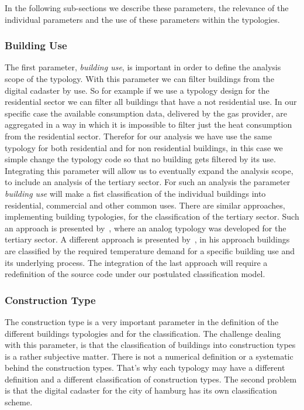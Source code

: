 \documentclass[authoryear,preprint,review,12pt]{elsarticle}
\begin{document}
\begin{linenumbers}
In the following sub-sections we describe these parameters, the relevance of the
individual parameters and the use of these parameters within the typologies.\\

\subsubsection{Building Use}

The first parameter, \textit{building use}, is important in order to define the
analysis scope of the typology.  With this parameter we can filter buildings
from the digital cadaster by use. So for example if we use a typology design
for the residential sector we can filter all buildings that have a not
residential use. In our specific case the available consumption data, delivered
by the gas provider, are aggregated in a way in which it is impossible to
filter just the heat consumption from the residential sector.  Therefor for our
analysis we have use the same typology for both residential and for non
residential buildings, in this case we simple change the typology code so that
no building gets filtered by its use.\\

Integrating this parameter will allow us to eventually expand the analysis
scope, to include an analysis of the tertiary sector.  For such an analysis the
parameter \textit{building use} will make a fist classification of the
individual buildings into residential, commercial and other common uses. There
are similar approaches, implementing building typologies, for the
classification of the tertiary sector.  Such an approach is presented
by~\citet{Loga.2011}, where an analog typology was
developed for the tertiary sector.  A different approach is presented
by~\citet{Blesl.2007}, in his
approach buildings are classified by the required temperature demand for a
specific building use and its underlying process. The integration of the last
approach will require a redefinition of the source code under our postulated
classification model.\\

\subsubsection{Construction Type}\label{sub-sub-sec:Ctype}

The construction type is a very important parameter in the definition of the
different buildings typologies and for the classification.  The challenge
dealing with this parameter, is that the classification of buildings into
construction types is a rather subjective matter.  There is not a numerical
definition or a systematic behind the construction types.  That's why each
typology may have a different definition and a different classification of
construction types.  The second problem is that the digital cadaster for the
city of hamburg has its own classification scheme.\\


\end{linenumbers}
\end{document}
